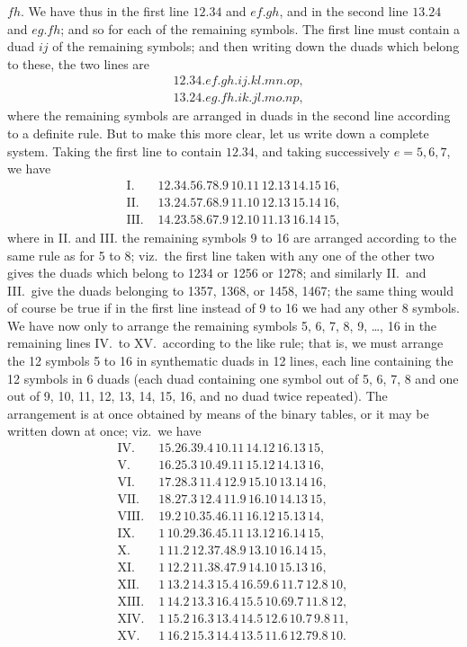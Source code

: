 \documentclass[11pt,a4paper]{book}
\begin{document}
\newpage
\noindent $fh$. We have thus in the first line $12.34$ and $ef.gh$, and in the second line $13.24$ and $eg.fh$; and so for each of the remaining symbols. The first line must contain a duad $ij$ of the remaining symbols; and then writing down the duads which belong to these, the two lines are
\begin{align*}
&12.34.ef.gh.ij.kl.mn.op, \\
&13.24.eg.fh.ik.jl.mo.np,
\end{align*}
where the remaining symbols are arranged in duads in the second line according to a definite rule. But to make this more clear, let us write down a complete system. Taking the first line to contain $12.34$, and taking successively $e = 5, 6, 7$, we have
\begin{align*}
\text{I. } &12.34.56.78.9\,10.11\,12.13\,14.15\,16, \\
\text{II. } &13.24.57.68.9\,11.10\,12.13\,15.14\,16, \\
\text{III. } &14.23.58.67.9\,12.10\,11.13\,16.14\,15,
\end{align*}
where in II. and III. the remaining symbols 9 to 16 are arranged according to the same rule as for 5 to 8; viz.\ the first line taken with any one of the other two gives the duads which belong to 1234 or 1256 or 1278; and similarly II.\ and III.\ give the duads belonging to 1357, 1368, or 1458, 1467; the same thing would of course be true if in the first line instead of 9 to 16 we had any other 8 symbols. We have now only to arrange the remaining symbols 5, 6, 7, 8, 9, \ldots, 16 in the remaining lines IV.\ to XV.\ according to the like rule; that is, we must arrange the 12 symbols 5 to 16 in synthematic duads in 12 lines, each line containing the 12 symbols in 6 duads (each duad containing one symbol out of 5, 6, 7, 8 and one out of 9, 10, 11, 12, 13, 14, 15, 16, and no duad twice repeated). The arrangement is at once obtained by means of the binary tables, or it may be written down at once; viz.\ we have
\begin{align*}
\text{IV. } &15.26.39.4\,10.11\,14.12\,16.13\,15, \\
\text{V. } &16.25.3\,10.49.11\,15.12\,14.13\,16, \\
\text{VI. } &17.28.3\,11.4\,12.9\,15.10\,13.14\,16, \\
\text{VII. } &18.27.3\,12.4\,11.9\,16.10\,14.13\,15, \\
\text{VIII. } &19.2\,10.35.46.11\,16.12\,15.13\,14, \\
\text{IX. } &1\,10.29.36.45.11\,13.12\,16.14\,15, \\
\text{X. } &1\,11.2\,12.37.48.9\,13.10\,16.14\,15, \\
\text{XI. } &1\,12.2\,11.38.47.9\,14.10\,15.13\,16, \\
\text{XII. } &1\,13.2\,14.3\,15.4\,16.59.6\,11.7\,12.8\,10, \\
\text{XIII. } &1\,14.2\,13.3\,16.4\,15.5\,10.69.7\,11.8\,12, \\
\text{XIV. } &1\,15.2\,16.3\,13.4\,14.5\,12.6\,10.7\,9.8\,11, \\
\text{XV. } &1\,16.2\,15.3\,14.4\,13.5\,11.6\,12.79.8\,10.
\end{align*}
\end{document}
